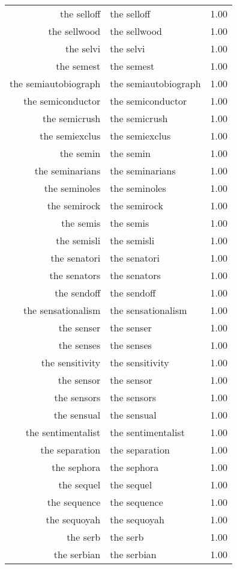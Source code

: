 \begin{table}[ht]
\begin{tabular}{rlr}
  the selloff & the selloff & 1.00 \\ 
  the sellwood & the sellwood & 1.00 \\ 
  the selvi & the selvi & 1.00 \\ 
  the semest & the semest & 1.00 \\ 
  the semiautobiograph & the semiautobiograph & 1.00 \\ 
  the semiconductor & the semiconductor & 1.00 \\ 
  the semicrush & the semicrush & 1.00 \\ 
  the semiexclus & the semiexclus & 1.00 \\ 
  the semin & the semin & 1.00 \\ 
  the seminarians & the seminarians & 1.00 \\ 
  the seminoles & the seminoles & 1.00 \\ 
  the semirock & the semirock & 1.00 \\ 
  the semis & the semis & 1.00 \\ 
  the semisli & the semisli & 1.00 \\ 
  the senatori & the senatori & 1.00 \\ 
  the senators & the senators & 1.00 \\ 
  the sendoff & the sendoff & 1.00 \\ 
  the sensationalism & the sensationalism & 1.00 \\ 
  the senser & the senser & 1.00 \\ 
  the senses & the senses & 1.00 \\ 
  the sensitivity & the sensitivity & 1.00 \\ 
  the sensor & the sensor & 1.00 \\ 
  the sensors & the sensors & 1.00 \\ 
  the sensual & the sensual & 1.00 \\ 
  the sentimentalist & the sentimentalist & 1.00 \\ 
  the separation & the separation & 1.00 \\ 
  the sephora & the sephora & 1.00 \\ 
  the sequel & the sequel & 1.00 \\ 
  the sequence & the sequence & 1.00 \\ 
  the sequoyah & the sequoyah & 1.00 \\ 
  the serb & the serb & 1.00 \\ 
  the serbian & the serbian & 1.00 \\ 

\end{tabular}
\end{table}
